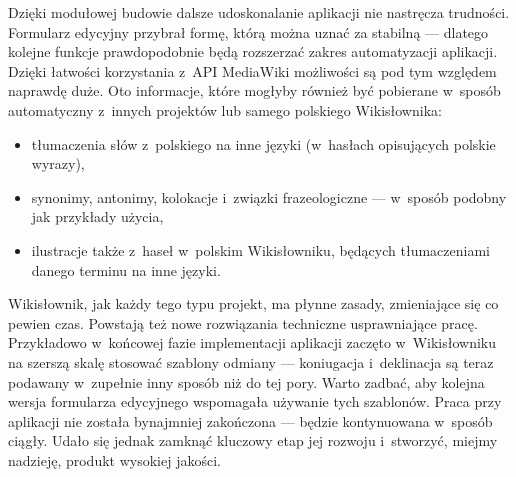 Dzięki modułowej budowie dalsze udoskonalanie aplikacji nie nastręcza trudności. Formularz edycyjny przybrał formę, którą można uznać za stabilną --- dlatego kolejne funkcje prawdopodobnie będą rozszerzać zakres automatyzacji aplikacji. Dzięki łatwości korzystania z~API MediaWiki możliwości są pod tym względem naprawdę duże. Oto informacje, które mogłyby również być pobierane w~sposób automatyczny z~innych projektów lub samego polskiego Wikisłownika:
\begin{itemize}
\item tłumaczenia słów z~polskiego na inne języki (w~hasłach opisujących polskie wyrazy),
\item synonimy, antonimy, kolokacje i~związki frazeologiczne --- w~sposób podobny jak przykłady użycia,
\item ilustracje także z~haseł w~polskim Wikisłowniku, będących tłumaczeniami danego terminu na inne języki.
\end{itemize}

Wikisłownik, jak każdy tego typu projekt, ma płynne zasady, zmieniające się co pewien czas. Powstają też nowe rozwiązania techniczne usprawniające pracę. Przykładowo w~końcowej fazie implementacji aplikacji zaczęto w~Wikisłowniku na szerszą skalę stosować szablony odmiany --- koniugacja i~deklinacja są teraz podawany w~zupełnie inny sposób niż do tej pory. Warto zadbać, aby kolejna wersja formularza edycyjnego wspomagała używanie tych szablonów. Praca przy aplikacji nie została bynajmniej zakończona --- będzie kontynuowana w~sposób ciągły. Udało się jednak zamknąć kluczowy etap jej rozwoju i~stworzyć, miejmy nadzieję, produkt wysokiej jakości.
